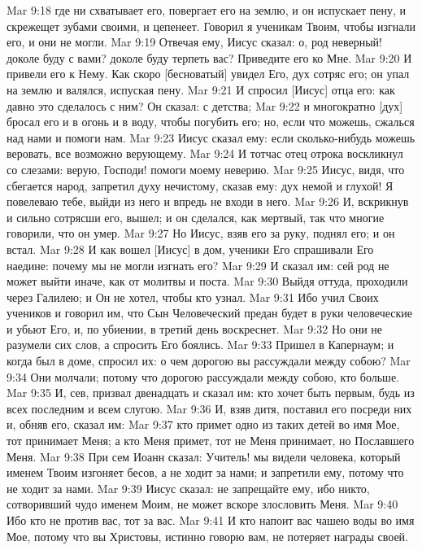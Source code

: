 Mar 9:18  где ни схватывает его, повергает его на землю, и он испускает пену, и скрежещет зубами своими, и цепенеет. Говорил я ученикам Твоим, чтобы изгнали его, и они не могли.
Mar 9:19  Отвечая ему, Иисус сказал: о, род неверный! доколе буду с вами? доколе буду терпеть вас? Приведите его ко Мне.
Mar 9:20  И привели его к Нему. Как скоро [бесноватый] увидел Его, дух сотряс его; он упал на землю и валялся, испуская пену.
Mar 9:21  И спросил [Иисус] отца его: как давно это сделалось с ним? Он сказал: с детства;
Mar 9:22  и многократно [дух] бросал его и в огонь и в воду, чтобы погубить его; но, если что можешь, сжалься над нами и помоги нам.
Mar 9:23  Иисус сказал ему: если сколько-нибудь можешь веровать, все возможно верующему.
Mar 9:24  И тотчас отец отрока воскликнул со слезами: верую, Господи! помоги моему неверию.
Mar 9:25  Иисус, видя, что сбегается народ, запретил духу нечистому, сказав ему: дух немой и глухой! Я повелеваю тебе, выйди из него и впредь не входи в него.
Mar 9:26  И, вскрикнув и сильно сотрясши его, вышел; и он сделался, как мертвый, так что многие говорили, что он умер.
Mar 9:27  Но Иисус, взяв его за руку, поднял его; и он встал.
Mar 9:28  И как вошел [Иисус] в дом, ученики Его спрашивали Его наедине: почему мы не могли изгнать его?
Mar 9:29  И сказал им: сей род не может выйти иначе, как от молитвы и поста.
Mar 9:30  Выйдя оттуда, проходили через Галилею; и Он не хотел, чтобы кто узнал.
Mar 9:31  Ибо учил Своих учеников и говорил им, что Сын Человеческий предан будет в руки человеческие и убьют Его, и, по убиении, в третий день воскреснет.
Mar 9:32  Но они не разумели сих слов, а спросить Его боялись.
Mar 9:33  Пришел в Капернаум; и когда был в доме, спросил их: о чем дорогою вы рассуждали между собою?
Mar 9:34  Они молчали; потому что дорогою рассуждали между собою, кто больше.
Mar 9:35  И, сев, призвал двенадцать и сказал им: кто хочет быть первым, будь из всех последним и всем слугою.
Mar 9:36  И, взяв дитя, поставил его посреди них и, обняв его, сказал им:
Mar 9:37  кто примет одно из таких детей во имя Мое, тот принимает Меня; а кто Меня примет, тот не Меня принимает, но Пославшего Меня.
Mar 9:38  При сем Иоанн сказал: Учитель! мы видели человека, который именем Твоим изгоняет бесов, а не ходит за нами; и запретили ему, потому что не ходит за нами.
Mar 9:39  Иисус сказал: не запрещайте ему, ибо никто, сотворивший чудо именем Моим, не может вскоре злословить Меня.
Mar 9:40  Ибо кто не против вас, тот за вас.
Mar 9:41  И кто напоит вас чашею воды во имя Мое, потому что вы Христовы, истинно говорю вам, не потеряет награды своей.
